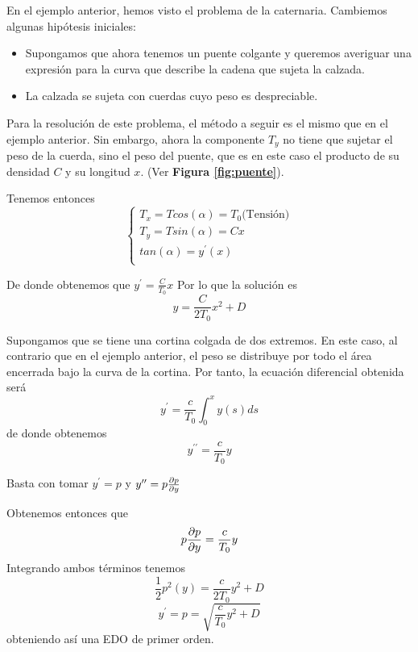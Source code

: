 \documentclass{mathnotes}
\begin{document}

\begin{example}
En el ejemplo anterior, hemos visto el problema de la caternaria. Cambiemos algunas hipótesis iniciales:
\begin{itemize}
\item Supongamos que ahora tenemos un puente colgante y queremos averiguar una expresión para la curva que describe la cadena que sujeta la calzada.
\item La calzada se sujeta con cuerdas cuyo peso es despreciable.
\end{itemize}
Para la resolución de este problema, el método a seguir es el mismo que en el ejemplo anterior. Sin embargo, ahora la componente $T_y$ no tiene que sujetar el peso de la cuerda, sino el peso del puente, que es en este caso el producto de su densidad $C$ y su longitud $x$. (Ver \textbf{Figura \ref{fig:puente}}).

Tenemos entonces
\begin{equation*}
  \left\lbrace
  \begin{array}{l}
     T_x = Tcos(\alpha)=T_0 \text{(Tensión)} \\
     T_y = Tsin(\alpha) = Cx \\
     tan(\alpha) = y^\prime(x)\\
  \end{array}
  \right.
\end{equation*}

De donde obtenemos que $y^\prime = \frac{C}{T_0}x$
Por lo que la solución es $$y = \frac{C}{2T_0}x^2 + D$$
\end{example}

\begin{example}
Supongamos que se tiene una cortina colgada de dos extremos. En este caso, al contrario que en el ejemplo anterior, el peso se distribuye por todo el área encerrada bajo la curva de la cortina. Por tanto, la ecuación diferencial obtenida será $$y^\prime = \frac{c}{T_0}\int_0^x y(s)ds$$ de donde obtenemos $$y^{\prime\prime} = \frac{c}{T_0}y$$

Basta con tomar $y^\prime = p$ y $y^{\prime\prime} = p\partialder{y}{p}$

Obtenemos entonces que $$p\partialder{y}{p} = \frac{c}{T_0}y$$ 
Integrando ambos términos tenemos $$\frac{1}{2}p^2(y) = \frac{c}{2T_0}y^2+D$$
$$y^\prime = p = \sqrt{\frac{c}{T_0}y^2+D}$$
obteniendo así una EDO de primer orden.
\end{example}
\end{document}
